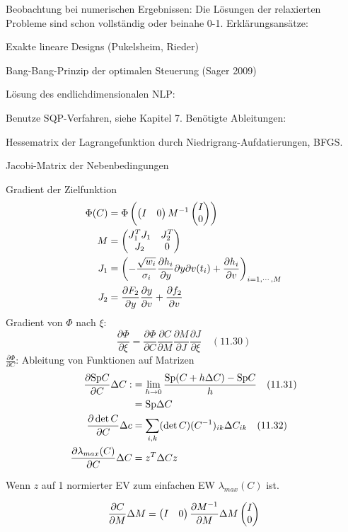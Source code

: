 Beobachtung bei numerischen Ergebnissen: Die Lösungen der relaxierten Probleme sind schon vollständig oder beinahe 0-1. Erklärungsansätze:
\bitm
\item Exakte lineare Designs (Pukelsheim, Rieder)
\item Bang-Bang-Prinzip der optimalen Steuerung (Sager 2009)
\eitm
\item Lösung des endlichdimensionalen NLP:

Benutze SQP-Verfahren, siehe Kapitel 7. Benötigte Ableitungen:
\bitm
\item Hessematrix der Lagrangefunktion durch Niedrigrang-Aufdatierungen, \zb BFGS.
\item Jacobi-Matrix der Nebenbedingungen 
\item Gradient der Zielfunktion
\eitm
\begin{align*}
\Phi(C) &= \Phi \left( \begin{pmatrix} I & 0 \end{pmatrix} M^{-1} \begin{pmatrix} I \\ 0 \end{pmatrix} \right) \\
M &= \begin{pmatrix} J_1^T J_1 & J_2^T \\ J_2 & 0 \end{pmatrix} \\
J_1 &= \left( - \frac{\sqrt{w_i}}{\sigma_i} \frac{\partial h_i}{\partial y}{\partial y}{\partial v} (t_i) + \frac{\partial h_i}{\partial v} \right)_{i=1,\cdots,M} \\
J_2 &= \frac{\partial F_2}{\partial y} \frac{\partial y}{\partial v} + \frac{\partial f_2}{\partial v} \\
\end{align*}
Gradient von $\Phi$ nach $\xi$:
\[ \frac{\partial \Phi}{\partial \xi} = \frac{\partial \Phi}{\partial C} \frac{\partial C}{\partial M} \frac{\partial M}{\partial J} \frac{\partial J}{\partial \xi} \quad (11.30) \]
$\frac{\partial \Phi}{\partial C}$: Ableitung von Funktionen auf Matrizen
\begin{align*}
\frac{\partial \mathrm{Sp} C}{\partial C} \Delta C :&= \lim_{h\to 0} \frac{\mathrm{Sp}(C+h\Delta C) - \mathrm{Sp} C}{h} \quad (11.31) \\
&= \mathrm{Sp} \Delta C \\
\frac{\partial \det C}{\partial C} \Delta c &= \sum\limits_{i,k} (\det C) (C^{-1})_{ik} \Delta C_{ik} \quad (11.32) \\
\frac{\partial \lambda_{max} (C)}{\partial C} \Delta C &= z^T \Delta C z \\
\end{align*}

Wenn $z$ auf 1 normierter EV zum einfachen EW $\lambda_{max}(C)$ ist.

\begin{align*}
\frac{\partial C}{\partial M} \Delta M &= \begin{pmatrix} I & 0 \end{pmatrix} \frac{\partial M^{-1}}{\partial M} \Delta M \begin{pmatrix} I \\ 0 \end{pmatrix} \\
\end{align*}

